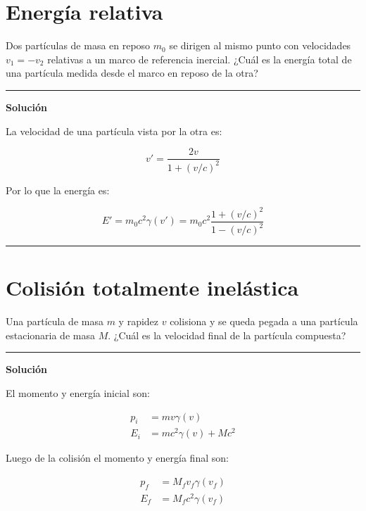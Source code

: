 \documentclass[12pt]{article}
\begin{document}
\section{Energía relativa}

Dos partículas de masa en reposo $m_0$ se dirigen al mismo punto con velocidades $v_1 = -v_2$ relativas
a un marco de referencia inercial. ¿Cuál es la energía total de una partícula medida desde el marco
en reposo de la otra?\\
\noindent\rule{16.5cm}{0.4pt}
\begin{center}
	\textbf{Solución}	
\end{center}

La velocidad de una partícula vista por la otra es:


\begin{equation}
v'= \frac{2v}{1+ (v/c)^2}
\end{equation}

Por lo que la energía es:

\begin{equation}
E' = m_0 c^2  \gamma(v') =  m_0 c^2 \frac{1+ (v/c)^2}{1- (v/c)^2}
\end{equation}


\noindent\rule{16.5cm}{0.4pt}



\section{Colisión totalmente inelástica}


 Una partícula de masa $m$ y rapidez $v$ colisiona y se queda pegada a una partícula estacionaria
de masa $M$. ¿Cuál es la velocidad final de la partícula compuesta?\\
\noindent\rule{16.5cm}{0.4pt}
\begin{center}
	\textbf{Solución}	
\end{center}

El momento y energía inicial son:

\begin{align*}
p_i &= mv\gamma(v)\\
E_i & = mc^2\gamma(v) + Mc^2
\end{align*}

Luego de la colisión el momento y energía final son:

\begin{align*}
p_f &= M_f v_f\gamma(v_f)\\
E_f & = M_fc^2\gamma(v_f) 
\end{align*}
\end{document}
